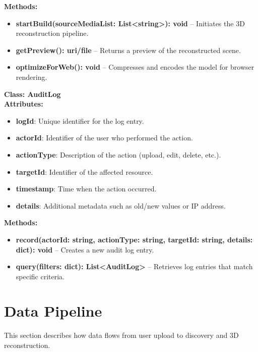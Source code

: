 \textbf{Methods:}
\begin{itemize}
    \item \textbf{startBuild(sourceMediaList: List<string>): void} -- Initiates the 3D reconstruction pipeline.
    \item \textbf{getPreview(): uri/file} -- Returns a preview of the reconstructed scene.
    \item \textbf{optimizeForWeb(): void} -- Compresses and encodes the model for browser rendering.
\end{itemize}


\bigskip
\textbf{Class: AuditLog}\\
\textbf{Attributes:}
\begin{itemize}
    \item \textbf{logId}: Unique identifier for the log entry.
    \item \textbf{actorId}: Identifier of the user who performed the action.
    \item \textbf{actionType}: Description of the action (upload, edit, delete, etc.).
    \item \textbf{targetId}: Identifier of the affected resource.
    \item \textbf{timestamp}: Time when the action occurred.
    \item \textbf{details}: Additional metadata such as old/new values or IP address.
\end{itemize}

\textbf{Methods:}
\begin{itemize}
    \item \textbf{record(actorId: string, actionType: string, targetId: string, details: dict): void} -- Creates a new audit log entry.
    \item \textbf{query(filters: dict): List<AuditLog>} -- Retrieves log entries that match specific criteria.
\end{itemize}


\section{Data Pipeline}
This section describes how data flows from user upload to discovery and 3D reconstruction.

